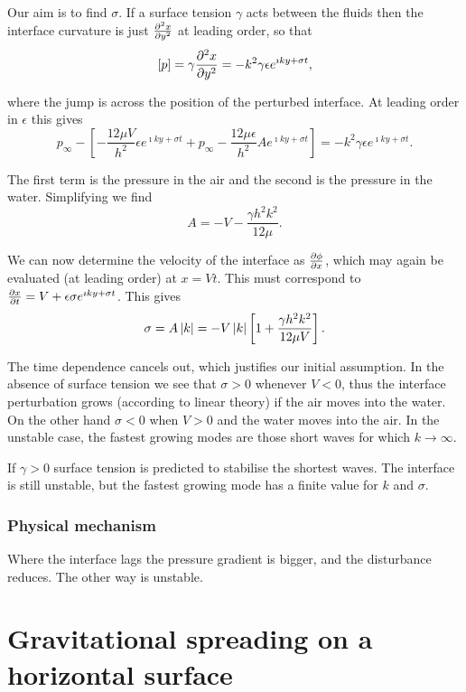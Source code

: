 \documentclass{notes}
\theoremstyle{plain}
\begin{document}
Our aim is to find $\sigma$.  If a surface tension $\gamma$ acts between
the fluids then the interface curvature is just $\frac{\partial ^2 x}{\partial y^2}$
at leading order, so that
\[
\left[ p \right] = \gamma \frac{\partial ^2 x}{\partial y^2} = -k^2 \gamma \epsilon e^{\imath
k y + \sigma t},
\]

where the jump is across the position of the perturbed interface.  At
leading order in $\epsilon$ this gives
\[
p_\infty - \left[ - \frac{12 \mu V}{h^2} \epsilon e^{\imath k y + \sigma
t} + p_\infty - \frac{12 \mu \epsilon}{h^2} A e^{\imath k y + \sigma t} 
\right] = -k^2 \gamma \epsilon e^{\imath k y + \sigma t}.
\]

The first term is the pressure in the air and the second is the pressure
in the water.  Simplifying we find
\[
A = -V - \frac{\gamma h^2 k^2}{12 \mu}.
\]

We can now determine the velocity of the interface as $\frac{\partial \phi}{\partial x}$,
which may again be evaluated (at leading order) at $x = V t$.  This
must correspond to $\frac{\partial x}{\partial t} = V + \epsilon \sigma e^{\imath k y 
+ \sigma t}$. This gives
\[
\sigma = A \left|k\right| = - V \left|k\right| \left[ 1 + \frac{\gamma h^2 k^2}{12 \mu V}
\right].
\]

The time dependence cancels out, which justifies our initial assumption.
In the absence of surface tension we see that $\sigma > 0$ whenever $V < 0$,
thus the interface perturbation grows (according to linear theory) if
the air moves into the water.  On the other hand $\sigma < 0$ when
$V > 0$ and the water moves into the air.  In the unstable case, the
fastest growing modes are those short waves for which $k \to \infty$.

If $\gamma > 0$ surface tension is predicted to stabilise the shortest
waves.  The interface is still unstable, but the fastest growing mode
has a finite value for $k$ and $\sigma$.

\subsubsection*{Physical mechanism}

\vspace{1in}

Where the interface lags the pressure gradient is bigger, and the disturbance
reduces.  The other way is unstable.

\section[Gravitational spreading]%
{Gravitational spreading on a horizontal surface}
\end{document}
